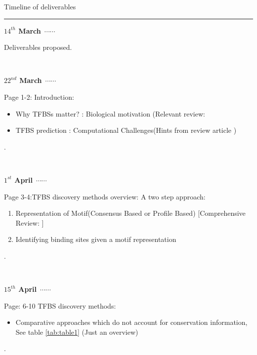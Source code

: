 \documentclass[a4paper,11pt]{article}
\newcommand\ytl[2]{
\parbox[b]{8em}{\hfill{\color{cyan}\bfseries\sffamily #1}~$\cdots\cdots$~}\makebox[0pt][c]{$\bullet$}\vrule\quad \parbox[c]{4.5cm}{\vspace{7pt}\color{red!40!black!80}\raggedright\sffamily #2.\\[7pt]}\\[-3pt]}
\begin{document}
\begin{table}
\caption{Timeline of deliverables}
\label{tab:table2}
\centering
\footnotesize
\begin{minipage}[t]{.7\linewidth}
\color{gray}
\rule{\linewidth}{1pt}
\bigskip
\ytl{$14^{th}$ March}{Deliverables proposed}
\bigskip
\ytl{$22^{nd}$ March}{Page 1-2: Introduction:\footnotesize\begin{itemize}\itemsep0em 
\item Why TFBSs matter? : Biological motivation (Relevant review: \cite{wray_evolutionary_2007}
\item TFBS prediction : Computational Challenges(Hints from review article \cite{weirauch_evaluation_2013})
\end{itemize}}
\bigskip
\ytl{$1^{st}$ April}{Page 3-4:TFBS discovery methods overview: A two step approach: \footnotesize\begin{enumerate}\itemsep0em 
\item Representation of Motif(Consensus Based or Profile Based) [Comprehensive Review: \cite{stormo_modeling_2013}]
\item Identifying binding sites given a motif representation
\end{enumerate}}
\bigskip
\ytl{$15^{th}$ April}{Page: 6-10 TFBS discovery methods:
\begin{itemize}
\item Comparative approaches which do not account for conservation information, See table \ref{tab:table1} (Just an overview)

\end{itemize}}
\end{minipage}
\end{table}
\end{document}
